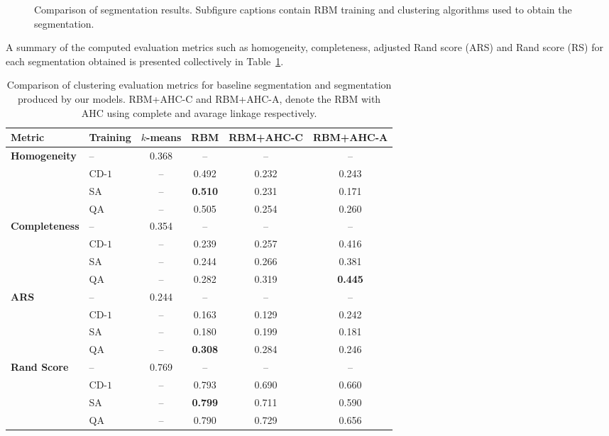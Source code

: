 \documentclass[runningheads]{llncs}
\begin{document}
\begin{figure}
    \caption{Comparison of segmentation results. Subfigure captions contain RBM training and clustering algorithms used to obtain the segmentation.}
    \label{fig:comparison_seg}
\end{figure}

A summary of the computed evaluation metrics such as homogeneity, completeness,
adjusted Rand score (ARS) and Rand score (RS) for each segmentation obtained is
presented collectively in Table~\ref{tab:segmentation_metrics_comparison}.
\begin{table}[ht]
    \centering
    \caption[Comparison of clustering evaluation metrics for baseline segmentation and segmentation produced by our models.]{Comparison of clustering evaluation metrics for baseline segmentation and segmentation produced by our models. RBM+AHC-C and RBM+AHC-A, denote the RBM with AHC using complete and avarage linkage respectively. }
    \begin{tabular}{@{} llcccc @{}}
        \toprule
        \textbf{Metric} & \textbf{Training} & \textbf{$k$-means} & \textbf{RBM} & \textbf{RBM+AHC-C} & \textbf{RBM+AHC-A} \\
        \midrule
        \textbf{Homogeneity} & -- & 0.368 & -- & -- & -- \\
                             & CD-$1$ & -- & 0.492 & 0.232 & 0.243 \\
                             & SA  & -- & \textbf{0.510} & 0.231 & 0.171 \\
                             & QA  & -- & 0.505 & 0.254 & 0.260 \\
        \midrule
        \textbf{Completeness} & -- & 0.354 & -- & -- & -- \\
                              & CD-$1$ & -- & 0.239 & 0.257 & 0.416 \\
                              & SA  & -- & 0.244 & 0.266 & 0.381 \\
                              & QA  & -- & 0.282 & 0.319 & \textbf{0.445} \\
        \midrule
        \textbf{ARS} & -- & 0.244 & -- & -- & -- \\
                     & CD-$1$ & -- & 0.163 & 0.129 & 0.242 \\
                     & SA  & -- & 0.180 & 0.199 & 0.181 \\
                     & QA  & -- & \textbf{0.308} & 0.284 & 0.246 \\
        \midrule
        \textbf{Rand Score} & -- & 0.769 & -- & -- & -- \\
                            & CD-$1$ & -- & 0.793 & 0.690 & 0.660 \\
                            & SA  & -- & \textbf{0.799} & 0.711 & 0.590 \\
                            & QA  & -- & 0.790 & 0.729 & 0.656 \\
        \bottomrule
    \end{tabular}
    \label{tab:segmentation_metrics_comparison}
\end{table}
\end{document}
